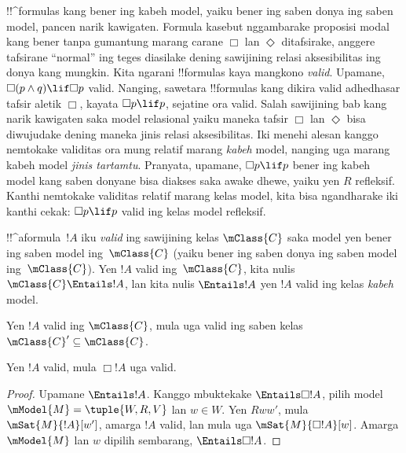 \documentclass[../../../include/open-logic-section]{subfiles}
\begin{document}


\begin{explain}
  !!^{formula}s kang bener ing kabeh model, yaiku bener ing saben donya
  ing saben model, pancen narik kawigaten. Formula kasebut nggambarake
  proposisi modal kang bener tanpa gumantung marang carane $\Box$ lan
  $\Diamond$ ditafsirake, anggere tafsirane ``normal'' ing teges
  diasilake dening sawijining relasi aksesibilitas ing donya kang
  mungkin. Kita ngarani !!{formula}s kaya mangkono \emph{valid}.
  Upamane, $\Box(p \land q) \lif \Box p$ valid. Nanging, sawetara
  !!{formula}s kang dikira valid adhedhasar tafsir aletik $\Box$,
  kayata $\Box p \lif p$, sejatine ora valid. Salah sawijining
  bab kang narik kawigaten saka model relasional yaiku maneka
  tafsir $\Box$ lan $\Diamond$ bisa diwujudake dening maneka
  jinis relasi aksesibilitas. Iki menehi alesan kanggo nemtokake
  validitas ora mung relatif marang \emph{kabeh} model, nanging uga
  marang kabeh model \emph{jinis tartamtu}. Pranyata, upamane,
  $\Box p \lif p$ bener ing kabeh model kang saben donyane bisa
  diakses saka awake dhewe, yaiku yen $R$ refleksif. Kanthi
  nemtokake validitas relatif marang kelas model, kita bisa
  ngandharake iki kanthi cekak: $\Box p \lif p$ valid ing kelas
  model refleksif.
\end{explain}

\begin{defn}
  !!^a{formula}~$!A$ iku \emph{valid} ing sawijining kelas $\mClass{C}$
  saka model yen bener ing saben model ing~$\mClass{C}$ (yaiku bener
  ing saben donya ing saben model ing~$\mClass{C}$). Yen $!A$ valid
  ing~$\mClass{C}$, kita nulis $\mClass{C} \Entails !A$, lan kita
  nulis $\Entails !A$ yen $!A$ valid ing kelas \emph{kabeh} model.
\end{defn}

\begin{prop}
  Yen $!A$ valid ing $\mClass{C}$, mula uga valid ing saben kelas
  $\mClass{C}' \subseteq \mClass{C}$.
\end{prop}

\begin{prop}
  Yen $!A$ valid, mula $\Box!A$ uga valid.
\end{prop}

\begin{proof}
  Upamane $\Entails !A$. Kanggo mbuktekake $\Entails \Box!A$, pilih model
  $\mModel{M} = \tuple{W, R, V}$ lan $w \in W$. Yen $Rww'$, mula
  $\mSat{M}{!A}[w']$, amarga $!A$ valid, lan mula uga
  $\mSat{M}{\Box!A}[w]$. Amarga $\mModel{M}$ lan $w$ dipilih
  sembarang, $\Entails \Box!A$.
\end{proof}
\end{document}
